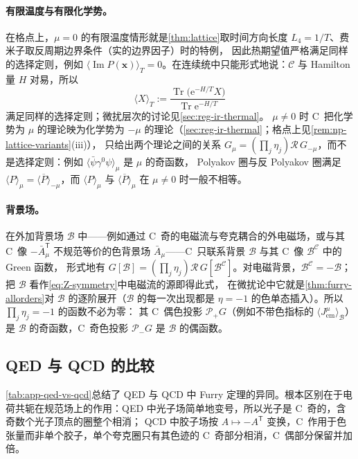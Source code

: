 \documentclass[UTF8,a4paper,11pt,fontset=fandol]{ctexart}
\theoremstyle{cplain}
\theoremstyle{cdefinition}
\theoremstyle{cremark}
\numberwithin{equation}{section}
\DeclareMathOperator{\Tr}{Tr}
\DeclareMathOperator{\Imag}{Im}
\newcommand{\tp}{\mathsf{T}}                         %
\newcommand{\Cop}{\mathcal{C}}                       %
\newcommand{\Rop}{\mathcal{R}}                       %
\newcommand{\Pp}{\mathcal{P}_{+}}                    %
\newcommand{\Pm}{\mathcal{P}_{-}}                    %
\newcommand{\ee}{\mathrm{e}}                        %
\begin{document}
\paragraph{有限温度与有限化学势。}在格点上，$\mu=0$ 的有限温度情形就是\cref{thm:lattice}取时间方向长度 $L_4=1/T$、费米子取反周期边界条件（实的边界因子）时的特例，
因此热期望值严格满足同样的选择定则，例如 $\langle\Imag P(\boldsymbol x)\rangle_T=0$。在连续统中只能形式地说：$\Cop$ 与 Hamilton 量 $H$ 对易，所以
\begin{equation*}
\langle X\rangle_T:=\frac{\Tr\bigl(\ee^{-H/T}X\bigr)}{\Tr\ee^{-H/T}}
\end{equation*}
满足同样的选择定则；微扰层次的讨论见\cref{sec:reg-ir-thermal}。
$\mu\neq0$ 时 C~把化学势为 $\mu$ 的理论映为化学势为 $-\mu$ 的理论（\cref{sec:reg-ir-thermal}；格点上见\cref{rem:np-lattice-variants}(iii)），
只给出两个理论之间的关系 $G_\mu=(\prod_j\eta_j)\Rop\,G_{-\mu}$，而不是选择定则：例如 $\langle\bar\psi\gamma^0\psi\rangle_\mu$ 是 $\mu$ 的奇函数，
Polyakov 圈与反 Polyakov 圈满足 $\langle P\rangle_\mu=\langle\overline P\rangle_{-\mu}$，而 $\langle P\rangle_\mu$ 与 $\langle\overline P\rangle_\mu$ 在 $\mu\neq0$ 时一般不相等。

\paragraph{背景场。}在外加背景场 $\mathcal B$ 中——例如通过 C~奇的电磁流与夸克耦合的外电磁场，或与其 C~像 $-\bar A_\mu^{\tp}$ 不规范等价的色背景场 $\bar A_\mu$——C~只联系背景 $\mathcal B$ 与其 C~像 $\mathcal B^{\Cop}$ 中的 Green 函数，
形式地有 $G[\mathcal B]=(\prod_j\eta_j)\Rop\,G[\mathcal B^{\Cop}]$。对电磁背景，$\mathcal B^{\Cop}=-\mathcal B$；把 $\mathcal B$ 看作\cref{eq:Z-symmetry}中电磁流的源即得此式，
在微扰论中它就是\cref{thm:furry-allorders}对 $\mathcal B$ 的逐阶展开（$\mathcal B$ 的每一次出现都是 $\eta=-1$ 的色单态插入）。所以 $\prod_j\eta_j=-1$ 的函数不必为零：
其 C~偶色投影 $\Pp G$（例如不带色指标的 $\langle J^\mu_{\mathrm{em}}\rangle_{\mathcal B}$）是 $\mathcal B$ 的奇函数，C~奇色投影 $\Pm G$ 是 $\mathcal B$ 的偶函数。

\subsection{QED 与 QCD 的比较}\label{sec:applications-compare}



\cref{tab:app-qed-vs-qcd}总结了 QED 与 QCD 中 Furry 定理的异同。根本区别在于电荷共轭在规范场上的作用：QED 中光子场简单地变号，所以光子是 C~奇的，含奇数个光子顶点的圈整个相消；
QCD 中胶子场按 $A\mapsto-A^{\tp}$ 变换，C~作用于色张量而非单个胶子，单个夸克圈只有其色迹的 C~奇部分相消，C~偶部分保留并加倍。
\end{document}
